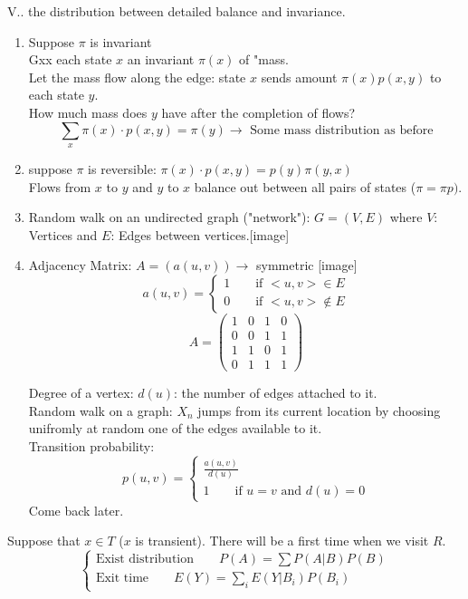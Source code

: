 \documentclass[12pt]{article}
\begin{document}
\newpage
V.. the distribution between detailed balance and invariance.
\begin{enumerate}[label=(\roman*)]
    \item Suppose $\pi$ is invariant\\
    [image]
    Gxx each state $x$ an invariant $\pi(x)$ of "mass.\\
    
    Let the mass flow along the edge: state $x$ sends amount $\pi(x)p(x,y)$ to each state $y$.\\
    [image]
    
    \vspace{1\baselineskip}
    How much mass does $y$ have after the completion of flows?
    $$\sum\limits_x \pi(x)\cdot p(x,y)=\pi(y)\to\text{ Some mass distribution as before}$$
    
    \item suppose $\pi$ is reversible: $\pi(x)\cdot p(x,y) = p(y)\pi(y,x)$\\
    [image]
    
    \vspace{1\baselineskip}
    Flows from $x$ to $y$ and $y$ to $x$ balance out between all pairs of states ($\pi=\pi p)$.
    
    \item Random walk on an undirected graph ("network"): $G=(V,E)$ where $V$: Vertices and $E$: Edges between vertices.[image]
    
    \item Adjacency Matrix: $A=(a(u,v))\to$ symmetric [image]
    $$a(u,v)=\begin{cases}1\qquad \text{if } <u,v>\in E\\
    0\qquad \text{if } <u,v> \notin E
    \end{cases}$$
    $$A=\begin{pmatrix}
    1&0&1&0\\0&0&1&1\\1&1&0&1\\0&1&1&1
    \end{pmatrix}$$
    
    Degree of a vertex: $d(u)$: the number of edges attached to it.\\
    
    Random walk on a graph: $X_n$ jumps from its current location by choosing unifromly at random one of the edges available to it.\\
    
    Transition probability: 
    $$p(u,v)=\begin{cases}
    \frac{a(u,v)}{d(u)}\\ 1\qquad\text{if $u=v$ and $d(u)=0$}
    \end{cases}$$
    Come back later.
\end{enumerate}

\newpage
[image]

\vspace{1\baselineskip}
Suppose that $x\in T$ ($x$ is transient). There will be a first time when we visit $R$.
$$\begin{cases}
\text{Exist distribution}\qquad P(A) = \sum P(A|B)P(B)\\
\text{Exit time}\qquad E(Y)= \sum\limits_i E(Y|B_i)P(B_i)
\end{cases}
$$
\end{document}
